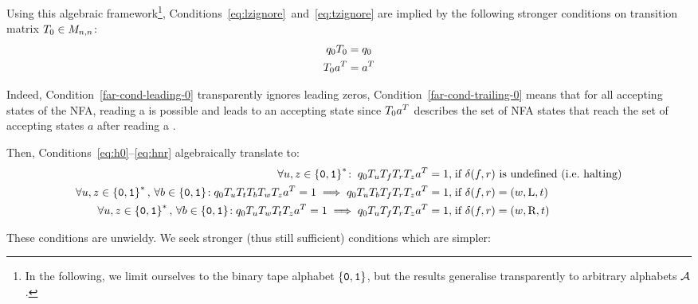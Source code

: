 Using this algebraic framework\footnote{In the following, we limit ourselves to the binary tape alphabet $\left\{\texttt{0},\texttt{1}\right\}$, but the results generalise transparently to arbitrary alphabets $\mathcal{A}$.}, Conditions~\eqref{eq:lzignore}~and~\eqref{eq:tzignore} are implied by the following stronger conditions on transition matrix $T_0 \in M_{n,n}$:
\begin{align}
    q_0 T_0 & = q_0
    \label{far-cond-leading-0}
    \\
    T_0 a^{T} & = a^{T}
    \label{far-cond-trailing-0}
\end{align}

Indeed, Condition~\eqref{far-cond-leading-0} transparently ignores leading zeros, Condition~\eqref{far-cond-trailing-0} means that for all accepting states of the NFA, reading a \szero is possible and leads to an accepting state since $T_0 a^{T}$ describes the set of NFA states that reach the set of accepting states $a$ after reading a \szero.

Then, Conditions~\ref{eq:h0}--\eqref{eq:hnr} algebraically translate to:
{\small
\begin{align*}
    \forall u,z\in\left\{\texttt{0},\texttt{1}\right\}^*\!: \; q_0 T_u T_f T_r T_z a^{T} = 1, \;                                                                             & \text{if $\delta(f,r)$ is undefined (i.e.~halting)}
    \\
    \forall u,z\in\left\{\texttt{0},\texttt{1}\right\}^*,\,\forall b \in \left\{\texttt{0},\texttt{1}\right\}\!: q_0 T_{u} T_t T_b T_w T_{z} a^{T} = 1 \implies q_0 T_{u} T_b T_f T_r T_{z} a^{T} = 1,\; & \text{if $\delta(f,r) = (w,\text{L},t)$}
    \\
    \forall u,z\in\left\{\texttt{0},\texttt{1}\right\}^*,\,\forall b \in \left\{\texttt{0},\texttt{1}\right\}\!: q_0 T_{u} T_w T_t T_{z} a^{T} = 1 \implies q_0 T_{u} T_f T_r T_{z} a^{T} = 1,\;         & \text{if $\delta(f,r) = (w,\text{R},t)$}
\end{align*}
}

These conditions are unwieldy. We seek stronger (thus still sufficient) conditions which are simpler:


